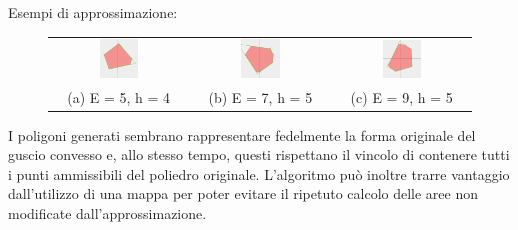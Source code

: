 \begin{center}
    Esempi di approssimazione:
\end{center}
\begin{figure}[H]
    \centering
    \begin{tabular}{ccc}
        \includegraphics[width=0.3\textwidth]{media/LessArea/5_4.png} &
        \includegraphics[width=0.3\textwidth]{media/LessArea/7_5.png} &
        \includegraphics[width=0.3\textwidth]{media/LessArea/9_5.png} \\
        (a) E = 5, h = 4 & (b) E = 7, h = 5 & (c) E = 9, h = 5
    \end{tabular}
\end{figure}

I poligoni generati sembrano rappresentare fedelmente la forma originale del guscio 
convesso e, allo stesso tempo, questi rispettano il vincolo di contenere tutti i punti 
ammissibili del poliedro originale.
L'algoritmo può inoltre trarre vantaggio dall'utilizzo di una mappa per poter 
evitare il ripetuto calcolo delle aree non modificate dall'approssimazione.
\\
